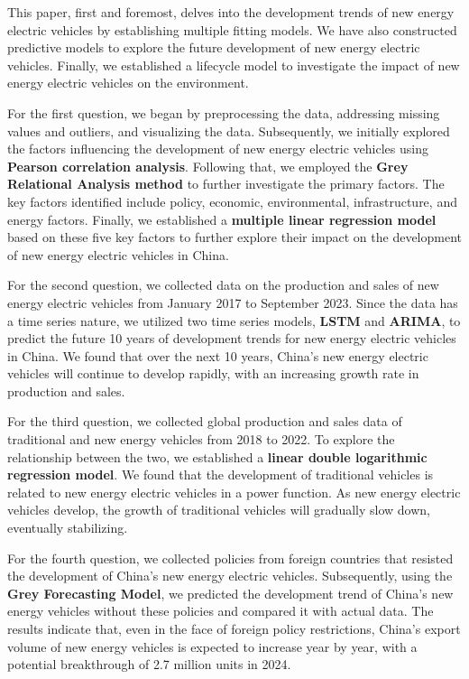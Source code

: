\documentclass{apmcmthesis}
\begin{document}
\pagestyle{frontmatterstyle}

\begin{abstract}


\end{abstract}
This paper, first and foremost, delves into the development trends of new energy electric vehicles by establishing multiple fitting models. We have also constructed predictive models to explore the future development of new energy electric vehicles. Finally, we established a lifecycle model to investigate the impact of new energy electric vehicles on the environment.

For the first question, we began by preprocessing the data, addressing missing values and outliers, and visualizing the data. Subsequently, we initially explored the factors influencing the development of new energy electric vehicles using \textbf{Pearson correlation analysis}. Following that, we employed the \textbf{Grey Relational Analysis method} to further investigate the primary factors. The key factors identified include policy, economic, environmental, infrastructure, and energy factors. Finally, we established a \textbf{multiple linear regression model} based on these five key factors to further explore their impact on the development of new energy electric vehicles in China.

For the second question, we collected data on the production and sales of new energy electric vehicles from January 2017 to September 2023. Since the data has a time series nature, we utilized two time series models, \textbf{LSTM} and \textbf{ARIMA}, to predict the future 10 years of development trends for new energy electric vehicles in China. We found that over the next 10 years, China's new energy electric vehicles will continue to develop rapidly, with an increasing growth rate in production and sales.

For the third question, we collected global production and sales data of traditional and new energy vehicles from 2018 to 2022. To explore the relationship between the two, we established a \textbf{linear double logarithmic regression model}. We found that the development of traditional vehicles is related to new energy electric vehicles in a power function. As new energy electric vehicles develop, the growth of traditional vehicles will gradually slow down, eventually stabilizing.

For the fourth question, we collected policies from foreign countries that resisted the development of China's new energy electric vehicles. Subsequently, using the \textbf{Grey Forecasting Model}, we predicted the development trend of China's new energy vehicles without these policies and compared it with actual data. The results indicate that, even in the face of foreign policy restrictions, China's export volume of new energy vehicles is expected to increase year by year, with a potential breakthrough of 2.7 million units in 2024.
\end{document}
